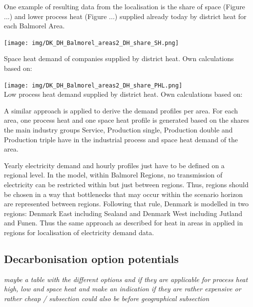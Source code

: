 \documentclass[review]{elsarticle}
\begin{document}
One example of resulting data from the localisation is the share of space (Figure ...) and lower process heat (Figure ...) supplied already today by district heat for each Balmorel Area.

\texttt{[image: img/DK\_DH\_Balmorel\_areas2\_DH\_share\_SH.png]}
\caption{Space heat demand of companies supplied by district heat. Own calculations based on: \cite{kortforsyningen2017,virk2017,Buhler2017,Petrovic2014,VM2015,StatisticsDenmark2016}}

\texttt{[image: img/DK\_DH\_Balmorel\_areas2\_DH\_share\_PHL.png]}\\
\caption{Low process heat demand supplied by district heat. Own calculations based on: \cite{kortforsyningen2017,virk2017,Buhler2017,Petrovic2014,VM2015,StatisticsDenmark2016}}
\fi
A similar approach is applied to derive the demand profiles per area. For each area, one process heat and one space heat profile is generated based on the shares the main industry groups Service, Production single, Production double and Production triple have in the industrial process and space heat demand of the area.

Yearly electricity demand and hourly profiles just have to be defined on a regional level. In the model, within Balmorel Regions, no transmission of electricity can be restricted within but just between regions. Thus, regions should be chosen in a way that bottlenecks that may occur within the scenario horizon are represented between regions. Following that rule, Denmark is modelled in two regions: Denmark East including Sealand and Denmark West including Jutland and Funen. Thus the same approach as described for heat in areas in applied in regions for localisation of electricity demand data.


\subsection{Decarbonisation option potentials}
\textit{maybe a table with the different options and if they are applicable for process heat high, low and space heat and make an indication if they are rather expensive or rather cheap / subsection could also be before geographical subsection}
\end{document}
